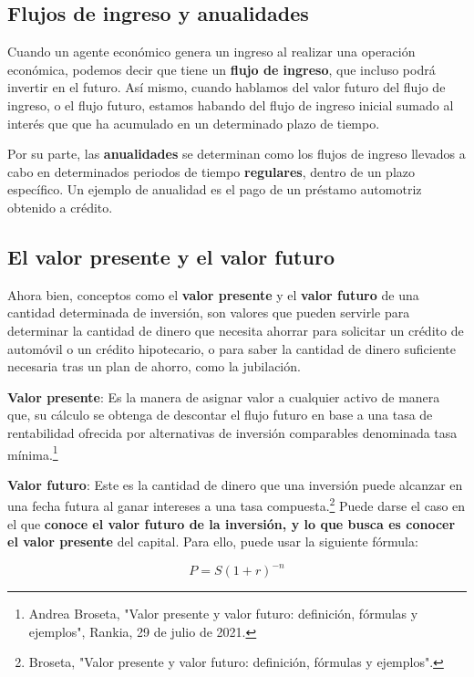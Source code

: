 \documentclass{article}
\begin{document}
        \subsection{Flujos de ingreso y anualidades}

            Cuando un agente económico genera un ingreso al realizar una operación económica, podemos decir que tiene un \textbf{flujo de ingreso}, que incluso podrá invertir en el futuro. Así mismo, cuando hablamos del valor futuro del flujo de ingreso, o el flujo futuro, estamos habando del flujo de ingreso inicial sumado al interés que que ha acumulado en un determinado plazo de tiempo.

            Por su parte, las \textbf{anualidades} se determinan como los flujos de ingreso llevados a cabo en determinados periodos de tiempo \textbf{regulares}, dentro de un plazo específico. Un ejemplo de anualidad es el pago de un préstamo automotriz obtenido a crédito.

        \subsection{El valor presente y el valor futuro}

            Ahora bien, conceptos como el \textbf{valor presente} y el \textbf{valor futuro} de una cantidad determinada de inversión, son valores que pueden servirle para determinar la cantidad de dinero que necesita ahorrar para solicitar un crédito de automóvil o un crédito hipotecario, o para saber la cantidad de dinero suficiente necesaria tras un plan de ahorro, como la jubilación.

            \textbf{Valor presente}: Es la manera de asignar valor a cualquier activo de manera que, su cálculo se obtenga de descontar el flujo futuro en base a una tasa de rentabilidad ofrecida por alternativas de inversión comparables denominada tasa mínima.\footnote[2]{Andrea Broseta, "Valor presente y valor futuro: definición, fórmulas y ejemplos", Rankia, 29 de julio de 2021.}

            \textbf{Valor futuro}: Este es la cantidad de dinero que una inversión puede alcanzar en una fecha futura al ganar intereses a una tasa compuesta.\footnote[3]{Broseta, "Valor presente y valor futuro: definición, fórmulas y ejemplos".} Puede darse el caso en el que \textbf{conoce el valor futuro de la inversión, y lo que busca es conocer el valor presente} del capital. Para ello, puede usar la siguiente fórmula:

            \begin{equation}
                P=S(1+r)^{-n}
            \end{equation}
\end{document}
